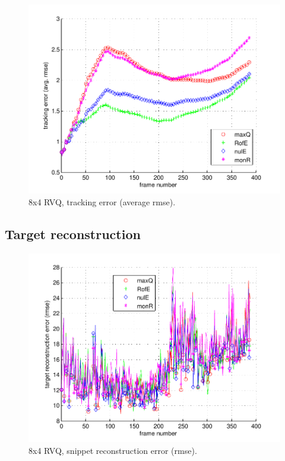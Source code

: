 								\begin{figure}[h!]
								\centering
								\includegraphics[height=0.38\textheight]{thesis/7_car11_8_4_1000_trk_armse.pdf}
								\caption{8x4 RVQ, tracking error (average rmse).}
								\label{fig:7_car11_8_4_1000_trk_avg_rmse}
								\end{figure}

\clearpage
\newpage
\subsection{Target reconstruction}

								\begin{figure}[h!]
								\centering
								\includegraphics[height=0.4\textheight]{thesis/7_car11_8_4_1000_snp_rmse.pdf}
								\caption{8x4 RVQ, snippet reconstruction error (rmse).}
								\label{fig:7_car11_8_4_1000_snp_rmse}
								\end{figure}


